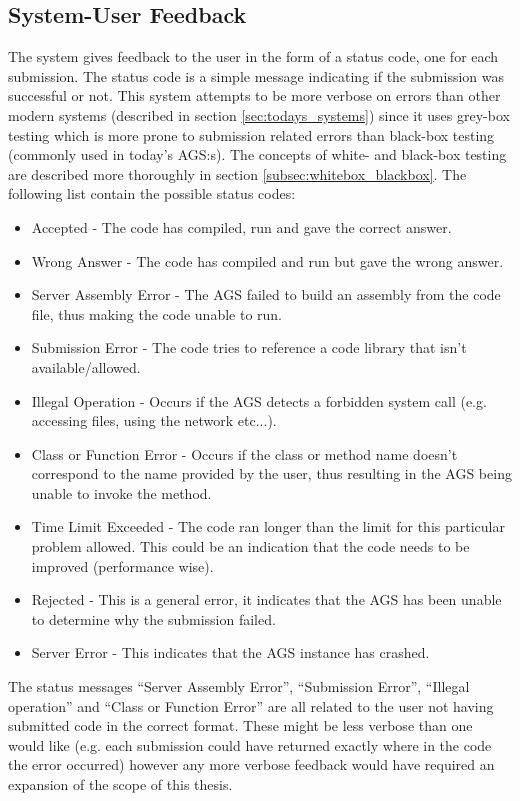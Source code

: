 \subsection{System-User Feedback} \label{subsec:status_codes}
The system gives feedback to the user in the form of a status code, one for each submission. The status code is a simple message indicating if the submission was successful or not. This system attempts to be more verbose on errors than other modern systems (described in section \ref{sec:todays_systems}) since it uses grey-box testing which is more prone to submission related errors than black-box testing (commonly used in today's AGS:s). The concepts of white- and black-box testing are described more thoroughly in section \ref{subsec:whitebox_blackbox}. The following list contain the possible status codes:

\begin{itemize}
	\item Accepted - The code has compiled, run and gave the correct answer.
	\item Wrong Answer - The code has compiled and run but gave the wrong answer.
	\item Server Assembly Error - The AGS failed to build an assembly from the code file, thus making the code unable to run.
	\item Submission Error - The code tries to reference a code library that isn't available/allowed. 
	\item Illegal Operation - Occurs if the AGS detects a forbidden system call (e.g. accessing files, using the network etc...).
	\item Class or Function Error - Occurs if the class or method name doesn't correspond to the name provided by the user, thus resulting in the AGS being unable to invoke the method.
	\item Time Limit Exceeded - The code ran longer than the limit for this particular problem allowed. This could be an indication that the code needs to be improved (performance wise).
	\item Rejected - This is a general error, it indicates that the AGS has been unable to determine why the submission failed. 
	\item Server Error - This indicates that the AGS instance has crashed.
\end{itemize}

The status messages ``Server Assembly Error'', ``Submission Error'', ``Illegal operation'' and ``Class or Function Error'' are all related to the user not having submitted code in the correct format. These might be less verbose than one would like (e.g. each submission could have returned exactly where in the code the error occurred) however any more verbose feedback would have required an expansion of the scope of this thesis.

